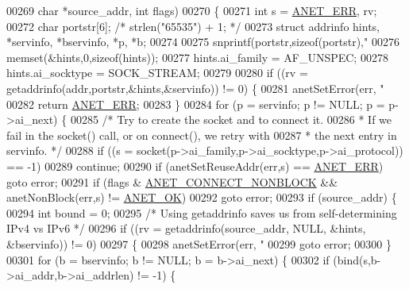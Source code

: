 \begin{DoxyCode}
{{{{{{{{{{{{{00269                                  \textcolor{keywordtype}{char} *source\_addr, \textcolor{keywordtype}{int} flags)
00270 \{
00271     \textcolor{keywordtype}{int} s = \hyperlink{anet_8h_a0697b7774a7e0f4ef141839fe93536fe}{ANET\_ERR}, rv;
00272     \textcolor{keywordtype}{char} portstr[6];  \textcolor{comment}{/* strlen("65535") + 1; */}
00273     \textcolor{keyword}{struct} addrinfo hints, *servinfo, *bservinfo, *p, *b;
00274 
00275     snprintf(portstr,\textcolor{keyword}{sizeof}(portstr),\textcolor{stringliteral}{"%
00276     memset(&hints,0,\textcolor{keyword}{sizeof}(hints));
00277     hints.ai\_family = AF\_UNSPEC;
00278     hints.ai\_socktype = SOCK\_STREAM;
00279 
00280     \textcolor{keywordflow}{if} ((rv = getaddrinfo(addr,portstr,&hints,&servinfo)) != 0) \{
00281         anetSetError(err, \textcolor{stringliteral}{"%
00282         \textcolor{keywordflow}{return} \hyperlink{anet_8h_a0697b7774a7e0f4ef141839fe93536fe}{ANET\_ERR};
00283     \}
00284     \textcolor{keywordflow}{for} (p = servinfo; p != NULL; p = p->ai\_next) \{
00285         \textcolor{comment}{/* Try to create the socket and to connect it.}
00286 \textcolor{comment}{         * If we fail in the socket() call, or on connect(), we retry with}
00287 \textcolor{comment}{         * the next entry in servinfo. */}
00288         \textcolor{keywordflow}{if} ((s = socket(p->ai\_family,p->ai\_socktype,p->ai\_protocol)) == -1)
00289             \textcolor{keywordflow}{continue};
00290         \textcolor{keywordflow}{if} (anetSetReuseAddr(err,s) == \hyperlink{anet_8h_a0697b7774a7e0f4ef141839fe93536fe}{ANET\_ERR}) \textcolor{keywordflow}{goto} error;
00291         \textcolor{keywordflow}{if} (flags & \hyperlink{anet_8c_a487909d18aa88f156b4ef393bc9ceaed}{ANET\_CONNECT\_NONBLOCK} && anetNonBlock(err,s) != 
      \hyperlink{anet_8h_a25fb91ccc6457153f6d2e21380d4c6cf}{ANET\_OK})
00292             \textcolor{keywordflow}{goto} error;
00293         \textcolor{keywordflow}{if} (source\_addr) \{
00294             \textcolor{keywordtype}{int} bound = 0;
00295             \textcolor{comment}{/* Using getaddrinfo saves us from self-determining IPv4 vs IPv6 */}
00296             \textcolor{keywordflow}{if} ((rv = getaddrinfo(source\_addr, NULL, &hints, &bservinfo)) != 0)
00297             \{
00298                 anetSetError(err, \textcolor{stringliteral}{"%
00299                 \textcolor{keywordflow}{goto} error;
00300             \}
00301             \textcolor{keywordflow}{for} (b = bservinfo; b != NULL; b = b->ai\_next) \{
00302                 \textcolor{keywordflow}{if} (bind(s,b->ai\_addr,b->ai\_addrlen) != -1) \{
}}}}}}}}}}}}}}}}
\end{DoxyCode}
